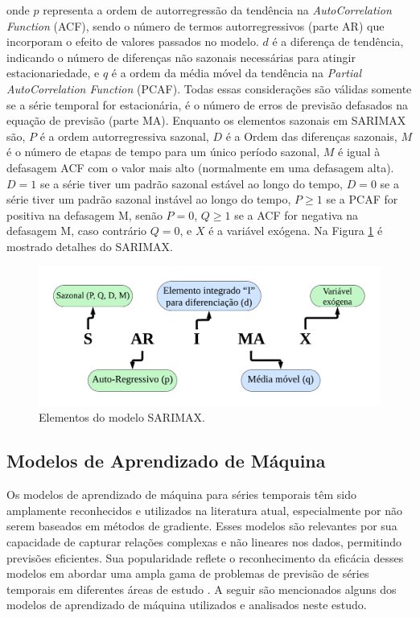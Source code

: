  \noindent onde $p$ representa a ordem de autorregressão da tendência na \textit{AutoCorrelation Function} (ACF), sendo o número de termos autorregressivos (parte AR) que incorporam o efeito de valores passados no modelo. $d$ é a diferença de tendência, indicando o número de diferenças não sazonais necessárias para atingir estacionariedade, e $q$ é a ordem da média móvel da tendência na \textit{Partial AutoCorrelation Function} (PCAF). Todas essas considerações são válidas somente se a série temporal for estacionária, é o número de erros de previsão defasados na equação de previsão (parte MA). Enquanto os elementos sazonais em SARIMAX são, $P$ é a ordem autorregressiva sazonal, $D$ é a Ordem das diferenças sazonais,
 $M$ é o número de etapas de tempo para um único período sazonal, $M$ é igual à defasagem ACF com o valor mais alto (normalmente em uma defasagem alta). $D=1$ se a série tiver um padrão sazonal estável ao longo do tempo, $D=0$ se a série tiver um padrão sazonal instável ao longo do tempo, $P\geq1$ se a PCAF for positiva na defasagem M, senão $P=0$, $Q\geq1$ se a ACF for negativa na defasagem M, caso contrário $Q=0$, e $X$ é a variável exógena. Na Figura \ref{fig:sarimaxmap} é mostrado detalhes do SARIMAX.
 

 
 \begin{figure}[H]
 	\centering
 	\caption{Elementos do modelo SARIMAX.}
 	\label{fig:sarimaxmap}
 	\includegraphics[width=\linewidth]{Modelos/Figuras/sarimax_map.pdf}
 	
 \end{figure}
 

 
 \subsection{Modelos de Aprendizado de M\'aquina}\label{subsec:reg}
 
 Os modelos de aprendizado de máquina para séries temporais têm sido amplamente reconhecidos e utilizados na literatura atual, especialmente por não serem baseados em métodos de gradiente. Esses modelos são relevantes por sua capacidade de capturar relações complexas e não lineares nos dados, permitindo previsões eficientes. Sua popularidade reflete o reconhecimento da eficácia desses modelos em abordar uma ampla gama de problemas de previsão de séries temporais em diferentes áreas de estudo \cite{al2021machine, sen2022machine, kheiri2023sentimentgpt}. A seguir são mencionados alguns dos modelos de aprendizado de máquina utilizados e analisados neste estudo.
 
